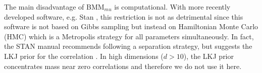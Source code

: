 \documentclass[12pt]{article}
\begin{document}
The main disadvantage of BMM$_{mu}$ is computational. %
With more recently developed software, e.g. Stan \citep{stan2014}, this restriction is not as  detrimental since this software is not based on Gibbs sampling but instead on Hamiltonian Monte Carlo (HMC) which is a Metropolis strategy for all parameters simultaneously.  In fact, the STAN manual \citep{stanmanual2014} recommends following a separation strategy, but suggests the LKJ prior for the correlation \cite{lewandowski2009generating}. In high dimensions ($d>10$), the LKJ prior concentrates mass near zero correlations and therefore we do not use it here.

\end{document}
